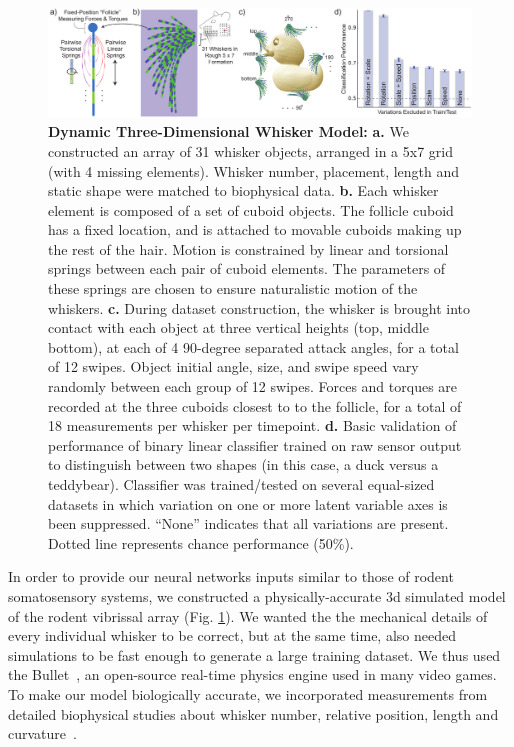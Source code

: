 \begin{figure}
\centering
\includegraphics [width=1\linewidth]{figures/whiskers.pdf}
\vspace{-2mm}
\caption{\textbf{Dynamic Three-Dimensional Whisker Model:} \textbf{a.} We constructed an array of 31 whisker objects, arranged in a 5x7 grid (with 4 missing elements).  
Whisker number, placement, length and static shape were matched to biophysical data. 
\textbf{b.} Each whisker element is composed of a set of cuboid objects.  
The follicle cuboid has a fixed location, and is attached to movable cuboids making up the rest of the hair. 
Motion is constrained by linear and torsional springs between each pair of cuboid elements.  
The parameters of these springs are chosen to ensure naturalistic motion of the whiskers.  
\textbf{c.} During dataset construction, the whisker is brought into contact with each object at three vertical heights (top, middle bottom), at each of 4 90-degree separated attack angles, for a total of 12 swipes.  
Object initial angle, size, and swipe speed vary randomly between each group of 12 swipes.
Forces and torques are recorded at the three cuboids closest to to the follicle, for a total of 18 measurements per whisker per timepoint. 
\textbf{d.} Basic validation of performance of binary linear classifier trained on raw sensor output to distinguish between two shapes (in this case, a duck versus a teddybear).  Classifier was trained/tested on several equal-sized datasets in which variation on one or more latent variable axes is been suppressed. ``None'' indicates that all variations are present. Dotted line represents chance performance (50\%).~\label{fig_whiskers}}
\end{figure}

In order to provide our neural networks inputs similar to those of rodent somatosensory systems, we constructed a physically-accurate 3d simulated model of the rodent vibrissal array (Fig. \ref{fig_whiskers}).  
We wanted the the mechanical details of every individual whisker to be correct, but at the same time, also needed simulations to be fast enough to generate a large training dataset.   
We thus used the Bullet~\cite{wiki:bullet}, an open-source real-time physics engine used in many video games. 
To make our model biologically accurate, we incorporated measurements from detailed biophysical studies about whisker number, relative position, length and curvature~\cite{Towal2011}.

